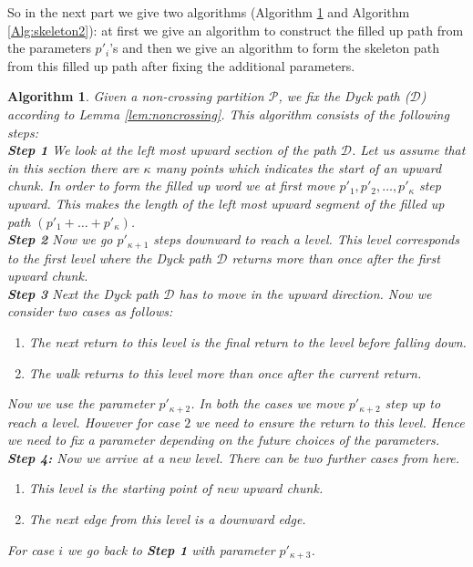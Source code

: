\documentclass[12pt]{article}
\numberwithin{equation}{section}
\newtheorem{algorithm}{Algorithm}[section]
\numberwithin{equation}{section}
\theoremstyle{definition}
\renewcommand{\1}{\bf 1}
\begin{document}
\noindent
So in the next part we give two algorithms (Algorithm \ref{alg:simplewig!} and Algorithm \ref{Alg:skeleton2}): at first we give an algorithm to construct the filled up path from the parameters $p'_{i}$'s and then we give an algorithm to form the skeleton path from this filled up path after fixing the additional parameters. 
\begin{algorithm}\label{alg:simplewig!}
Given a non-crossing partition $\mathcal{P}$, we fix the Dyck path ($\mathcal{D}$) according to Lemma \ref{lem:noncrossing}. This algorithm consists of the following steps:\\
\textbf{Step 1}
We look at the left most upward section of the path $\mathcal{D}$. Let us assume that in this section there are $\kappa$ many points which indicates the start of an upward chunk. In order to form the filled up word we at first move $p'_{1},p'_{2},\ldots,p'_{\kappa}$ step upward. This makes the length of the left most upward segment of the filled up path $\left(p'_{1}+\ldots + p'_{\kappa}\right)$.\\
\textbf{Step 2}
Now we go $p'_{\kappa+1}$ steps downward to reach a level. This level corresponds to the first level where the Dyck path $\mathcal{D}$ returns more than once after the first upward chunk. 
\\
\textbf{Step 3}
Next the Dyck path $\mathcal{D}$ has to move in the upward direction. Now we consider two cases as follows:
\begin{enumerate}
\item The next return to this level is the final return to the level before falling down.
\item The walk returns to this level more than once after the current return.
\end{enumerate}
Now we use the parameter $p'_{\kappa+2}$. In both the cases we move $p'_{\kappa+2}$ step up to reach a level. However for case $2$ we need to ensure the return to this level. Hence we need to fix a parameter depending on the future choices of the parameters.\\
\textbf{Step 4:} Now we arrive at a new level. There can be two further cases from here. 
\begin{enumerate}[i]
\item This level is the starting point of new upward chunk.
\item The next edge from this level is a downward edge. 
\end{enumerate}
For case $i$ we go back to \textbf{Step 1} with parameter $p'_{\kappa+3}$.


\end{algorithm}
\end{document}

